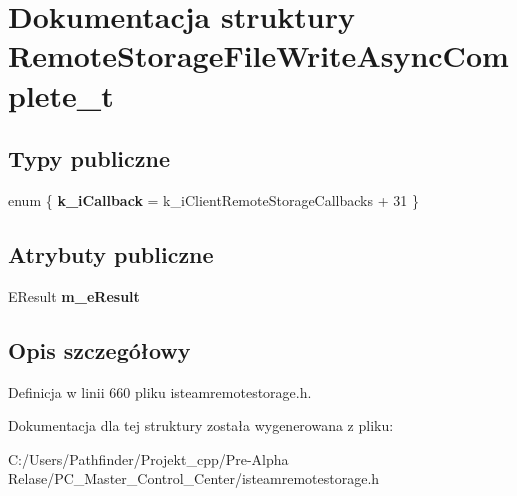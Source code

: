 \hypertarget{struct_remote_storage_file_write_async_complete__t}{}\section{Dokumentacja struktury Remote\+Storage\+File\+Write\+Async\+Complete\+\_\+t}
\label{struct_remote_storage_file_write_async_complete__t}
\subsection*{Typy publiczne}
\begin{DoxyCompactItemize}
\item 
\mbox{\label{struct_remote_storage_file_write_async_complete__t_a4f43a506f09416d9a2312bfd9a163582}} 
enum \{ {\bfseries k\+\_\+i\+Callback} = k\+\_\+i\+Client\+Remote\+Storage\+Callbacks + 31
 \}
\end{DoxyCompactItemize}
\subsection*{Atrybuty publiczne}
\begin{DoxyCompactItemize}
\item 
\mbox{\label{struct_remote_storage_file_write_async_complete__t_a891f9d25d2abd3f6410425b33b46a9b4}} 
E\+Result {\bfseries m\+\_\+e\+Result}
\end{DoxyCompactItemize}


\subsection{Opis szczegółowy}


Definicja w linii 660 pliku isteamremotestorage.\+h.



Dokumentacja dla tej struktury została wygenerowana z pliku\+:\begin{DoxyCompactItemize}
\item 
C\+:/\+Users/\+Pathfinder/\+Projekt\+\_\+cpp/\+Pre-\/\+Alpha Relase/\+P\+C\+\_\+\+Master\+\_\+\+Control\+\_\+\+Center/isteamremotestorage.\+h\end{DoxyCompactItemize}

